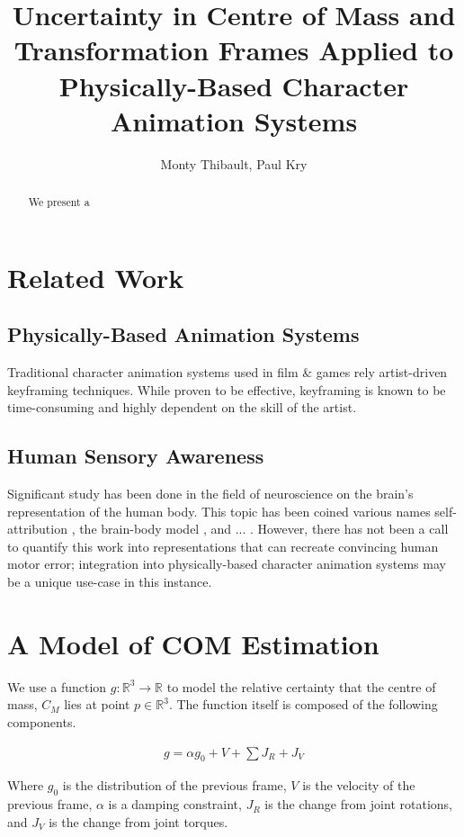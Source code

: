 \documentclass[]{article}
\title{Uncertainty in Centre of Mass and Transformation Frames Applied to Physically-Based Character Animation Systems}
\author{Monty Thibault, Paul Kry}
\begin{document}
\maketitle

\begin{abstract}
We present a 
\end{abstract}

\section{Related Work}
\subsection{Physically-Based Animation Systems}

Traditional character animation systems used in film \& games rely artist-driven keyframing techniques. While proven to be effective, keyframing is known to be time-consuming and highly dependent on the skill of the artist.

\subsection{Human Sensory Awareness}

Significant study has been done in the field of neuroscience on the brain's representation of the human body. This topic has been coined various names self-attribution \cite{2010-TOG-gbwc}, the brain-body model \cite{}, and ... . However, there has not been a call to quantify this work into representations that can recreate convincing human motor error; integration into physically-based character animation systems may be a unique use-case in this instance.

\section{A Model of COM Estimation}

We use a function $g: \mathbb{R}^3 \rightarrow \mathbb{R}$ to model the relative certainty that the centre of mass, $C_M$ lies at point $p \in \mathbb{R}^3$. The function itself is composed of the following components.

\begin{gather}
g = \alpha g_0 + V + \sum{J_R + J_V}
\end{gather}

Where $g_0$ is the distribution of the previous frame, $V$ is the velocity of the previous frame, $\alpha$ is a damping constraint, $J_R$ is the change from joint rotations, and $J_V$ is the change from joint torques.
\end{document}

